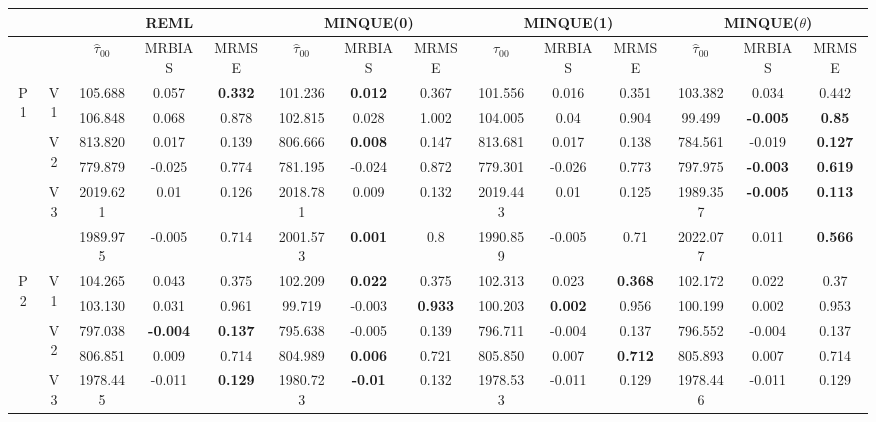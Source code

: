 \documentclass[12pt,a4paper]{article}
\begin{document}
\begin{sidewaystable}[ht]
\centering
{\footnotesize
\begin{tabular}{cc|ccc|ccc|ccc|ccc|}
   & & \multicolumn{3}{c|}{REML}&\multicolumn{3}{c|}{MINQUE(0)}&\multicolumn{3}{c|}{MINQUE(1)}&\multicolumn{3}{c|}{MINQUE($\theta$)}\\ \hline
 &  & $\hat{\tau}_{00}$ & MRBIAS & MRMSE & $\hat{\tau}_{00}$ & MRBIAS & MRMSE & $\hat{\tau}_{00}$ & MRBIAS & MRMSE & $\hat{\tau}_{00}$ & MRBIAS & MRMSE \\ 
  \hline
\multirow{6}{*}{P1} & \multirow{2}{*}{V1} & 105.688 & 0.057 & \textbf{0.332} & 101.236 & \textbf{0.012} & 0.367 & 101.556 & 0.016 & 0.351 & 103.382 & 0.034 & 0.442 \\ 
   &  & 106.848 & 0.068 & 0.878 & 102.815 & 0.028 & 1.002 & 104.005 & 0.04 & 0.904 & 99.499 & \textbf{-0.005} & \textbf{0.85} \\ 
   & \multirow{2}{*}{V2} & 813.820 & 0.017 & 0.139 & 806.666 & \textbf{0.008} & 0.147 & 813.681 & 0.017 & 0.138 & 784.561 & -0.019 & \textbf{0.127} \\ 
   &  & 779.879 & -0.025 & 0.774 & 781.195 & -0.024 & 0.872 & 779.301 & -0.026 & 0.773 & 797.975 & \textbf{-0.003} & \textbf{0.619} \\ 
   & \multirow{2}{*}{V3} & 2019.621 & 0.01 & 0.126 & 2018.781 & 0.009 & 0.132 & 2019.443 & 0.01 & 0.125 & 1989.357 & \textbf{-0.005} & \textbf{0.113} \\ 
   &  & 1989.975 & -0.005 & 0.714 & 2001.573 & \textbf{0.001} & 0.8 & 1990.859 & -0.005 & 0.71 & 2022.077 & 0.011 & \textbf{0.566} \\ 
   \hline \hline\multirow{6}{*}{P2} & \multirow{2}{*}{V1} & 104.265 & 0.043 & 0.375 & 102.209 & \textbf{0.022} & 0.375 & 102.313 & 0.023 & \textbf{0.368} & 102.172 & 0.022 & 0.37 \\ 
   &  & 103.130 & 0.031 & 0.961 & 99.719 & -0.003 & \textbf{0.933} & 100.203 & \textbf{0.002} & 0.956 & 100.199 & 0.002 & 0.953 \\ 
   & \multirow{2}{*}{V2} & 797.038 & \textbf{-0.004} & \textbf{0.137} & 795.638 & -0.005 & 0.139 & 796.711 & -0.004 & 0.137 & 796.552 & -0.004 & 0.137 \\ 
   &  & 806.851 & 0.009 & 0.714 & 804.989 & \textbf{0.006} & 0.721 & 805.850 & 0.007 & \textbf{0.712} & 805.893 & 0.007 & 0.714 \\ 
   & \multirow{2}{*}{V3} & 1978.445 & -0.011 & \textbf{0.129} & 1980.723 & \textbf{-0.01} & 0.132 & 1978.533 & -0.011 & 0.129 & 1978.446 & -0.011 & 0.129 \\ 

\end{tabular}}
\end{sidewaystable}
\end{document}
